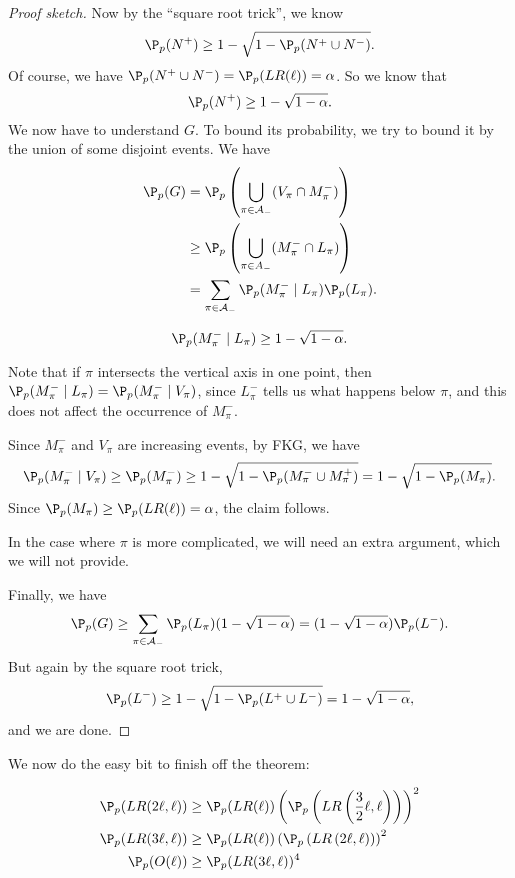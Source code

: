 \documentclass[a4paper]{article}
\begin{document}
\begin{proof}[Proof sketch]
  Now by the ``square root trick'', we know
  \[
    \P_p(N^+) \geq 1 - \sqrt{1 - \P_p(N^+ \cup N^-)}.
  \]
  Of course, we have $\P_p(N^+ \cup N^-) = \P_p(LR(\ell)) = \alpha$. So we know that
  \[
    \P_p(N^+) \geq 1 - \sqrt{1 - \alpha}.
  \]
  We now have to understand $G$. To bound its probability, we try to bound it by the union of some disjoint events. We have
  \begin{align*}
    \P_p(G) &= \P_p\left(\bigcup_{\pi \in \mathcal{A}_-} (V_\pi \cap M_\pi^-)\right)\\
    &\geq \P_p\left(\bigcup_{\pi \in A_-} (M_\pi^- \cap L_\pi)\right)\\
    &= \sum_{\pi \in \mathcal{A}_-} \P_p(M_\pi^- \mid L_\pi) \P_p(L_\pi).
  \end{align*}
  \begin{claim}
    \[
      \P_p(M_\pi^- \mid L_\pi) \geq 1 - \sqrt{1 - \alpha}.
    \]
  \end{claim}
  Note that if $\pi$ intersects the vertical axis in one point, then $\P_p(M_\pi^- \mid L_\pi) = \P_p(M_\pi^- \mid V_\pi)$, since $L_\pi^-$ tells us what happens below $\pi$, and this does not affect the occurrence of $M_\pi^-$.

  Since $M_\pi^-$ and $V_\pi$ are increasing events, by FKG, we have
  \[
    \P_p(M_\pi^- \mid V_\pi) \geq \P_p(M_\pi^-) \geq 1 - \sqrt{1 - \P_p(M_\pi^- \cup M_\pi^+)} = 1 - \sqrt{1 - \P_p(M_\pi)}.
  \]
  Since $\P_p(M_\pi) \geq \P_p(LR(\ell)) = \alpha$, the claim follows.

  In the case where $\pi$ is more complicated, we will need an extra argument, which we will not provide.

  Finally, we have
  \[
    \P_p(G) \geq \sum_{\pi \in \mathcal{A}_-} \P_p(L_\pi) (1 - \sqrt{1 - \alpha}) = (1 - \sqrt{1 - \alpha})\P_p(L^-).
  \]
  But again by the square root trick,
  \[
    \P_p(L^-) \geq 1 - \sqrt{1 - \P_p(L^+ \cup L^-)} = 1 - \sqrt{1 - \alpha},
  \]
  and we are done.
\end{proof}

We now do the easy bit to finish off the theorem:
\begin{lemma}
  \begin{align*}
    \P_p(LR(2\ell ,\ell)) &\geq \P_p(LR(\ell)) \left(\P_p\left(LR\left(\frac{3}{2}\ell, \ell\right)\right)\right)^2\\
    \P_p(LR(3\ell ,\ell)) &\geq \P_p(LR(\ell)) \left(\P_p\left(LR\left(2\ell, \ell\right)\right)\right)^2\\
    \P_p(O(\ell)) &\geq \P_p(LR(3\ell, \ell))^4
  \end{align*}
\end{lemma}
\end{document}
